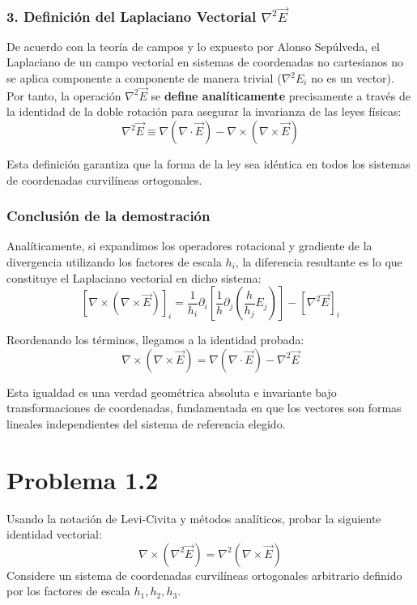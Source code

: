\documentclass[a4paper]{article}
\begin{document}
\subsubsection*{3. Definición del Laplaciano Vectorial $\nabla^2 \vec{E}$}

De acuerdo con la teoría de campos y lo expuesto por Alonso Sepúlveda, el Laplaciano de un campo vectorial en sistemas de coordenadas no cartesianos no se aplica componente a componente de manera trivial ($ \nabla^2 E_i $ no es un vector). Por tanto, la operación $\nabla^2 \vec{E}$ se \textbf{define analíticamente} precisamente a través de la identidad de la doble rotación para asegurar la invarianza de las leyes físicas:
$$\nabla^2 \vec{E} \equiv \nabla(\nabla \cdot \vec{E}) - \nabla \times (\nabla \times \vec{E})$$

Esta definición garantiza que la forma de la ley sea idéntica en todos los sistemas de coordenadas curvilíneas ortogonales. 

\subsubsection*{Conclusión de la demostración}

Analíticamente, si expandimos los operadores rotacional y gradiente de la divergencia utilizando los factores de escala $h_i$, la diferencia resultante es lo que constituye el Laplaciano vectorial en dicho sistema:
$$[\nabla \times (\nabla \times \vec{E})]_i = \frac{1}{h_i} \partial_i \left[ \frac{1}{h} \partial_j \left( \frac{h}{h_j} E_j \right) \right] - [\nabla^2 \vec{E}]_i$$

Reordenando los términos, llegamos a la identidad probada:
$$\nabla \times (\nabla \times \vec{E}) = \nabla(\nabla \cdot \vec{E}) - \nabla^2 \vec{E}$$

Esta igualdad es una verdad geométrica absoluta e invariante bajo transformaciones de coordenadas, fundamentada en que los vectores son formas lineales independientes del sistema de referencia elegido.


\section*{Problema 1.2}
Usando la notación de Levi-Civita y métodos analíticos, probar la siguiente identidad vectorial:
\begin{equation}
\nabla \times (\nabla^2 \vec{E}) = \nabla^2 (\nabla \times \vec{E})
\end{equation}
Considere un sistema de coordenadas curvilíneas ortogonales arbitrario definido por los factores de escala $h_1, h_2, h_3$.
\end{document}
